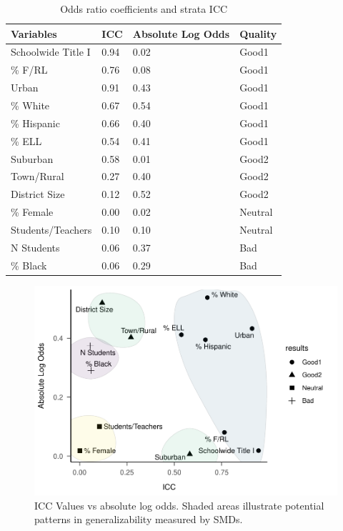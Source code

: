 \documentclass[man,floatsintext]{apa6}
\begin{document}
\begin{table}[tbp]
\begin{center}
\begin{threeparttable}
\caption{\label{tab:tab-ICC-Pars}Odds ratio coefficients and strata ICC}
\begin{tabular}{llll}
\toprule
Variables & ICC & Absolute Log Odds & Quality\\
\midrule
Schoolwide Title I & 0.94 & 0.02 & Good1\\
\% F/RL & 0.76 & 0.08 & Good1\\
Urban & 0.91 & 0.43 & Good1\\
\% White & 0.67 & 0.54 & Good1\\
\% Hispanic & 0.66 & 0.40 & Good1\\
\% ELL & 0.54 & 0.41 & Good1\\
Suburban & 0.58 & 0.01 & Good2\\
Town/Rural & 0.27 & 0.40 & Good2\\
District Size & 0.12 & 0.52 & Good2\\
\% Female & 0.00 & 0.02 & Neutral\\
Students/Teachers & 0.10 & 0.10 & Neutral\\
N Students & 0.06 & 0.37 & Bad\\
\% Black & 0.06 & 0.29 & Bad\\
\bottomrule
\end{tabular}
\end{threeparttable}
\end{center}
\end{table}



\begin{figure}
\centering
\includegraphics{GenSamp-Paper_files/figure-latex/fig-ICCvsCoef-1.pdf}
\caption{\label{fig:fig-ICCvsCoef}ICC Values vs absolute log odds. Shaded areas illustrate potential patterns in generalizability measured by SMDs.}
\end{figure}
\end{document}
